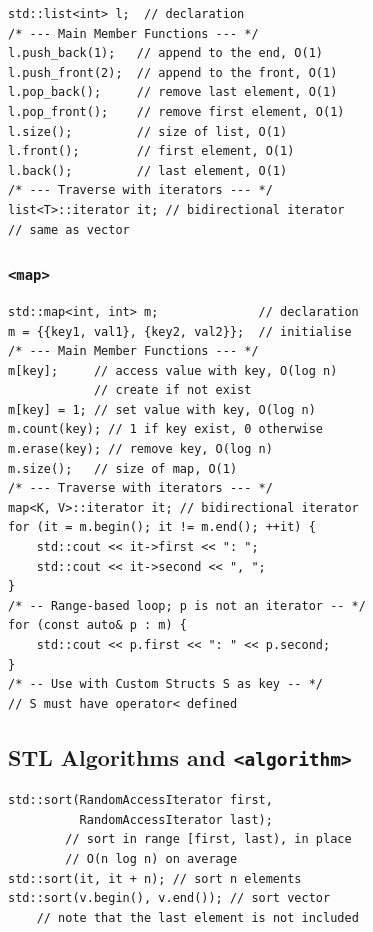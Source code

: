 \begin{verbatim}
std::list<int> l;  // declaration
/* --- Main Member Functions --- */
l.push_back(1);   // append to the end, O(1)
l.push_front(2);  // append to the front, O(1)
l.pop_back();     // remove last element, O(1)
l.pop_front();    // remove first element, O(1)
l.size();         // size of list, O(1)
l.front();        // first element, O(1)
l.back();         // last element, O(1)
/* --- Traverse with iterators --- */
list<T>::iterator it; // bidirectional iterator
// same as vector
\end{verbatim}
\vspace*{-1.25\baselineskip}

\subsubsection*{\texttt{<map>}}

\begin{verbatim}
std::map<int, int> m;              // declaration
m = {{key1, val1}, {key2, val2}};  // initialise
/* --- Main Member Functions --- */
m[key];     // access value with key, O(log n)
            // create if not exist
m[key] = 1; // set value with key, O(log n)
m.count(key); // 1 if key exist, 0 otherwise
m.erase(key); // remove key, O(log n)
m.size();   // size of map, O(1)
/* --- Traverse with iterators --- */
map<K, V>::iterator it; // bidirectional iterator
for (it = m.begin(); it != m.end(); ++it) {
    std::cout << it->first << ": ";
    std::cout << it->second << ", ";
}
/* -- Range-based loop; p is not an iterator -- */
for (const auto& p : m) {
    std::cout << p.first << ": " << p.second;
}
/* -- Use with Custom Structs S as key -- */
// S must have operator< defined
\end{verbatim}
\vspace*{-1.25\baselineskip}

\subsection*{STL Algorithms and \texttt{<algorithm>}}

\begin{verbatim}
std::sort(RandomAccessIterator first,
          RandomAccessIterator last);
        // sort in range [first, last), in place
        // O(n log n) on average
std::sort(it, it + n); // sort n elements
std::sort(v.begin(), v.end()); // sort vector
    // note that the last element is not included
\end{verbatim}
\vspace*{-1.25\baselineskip}

